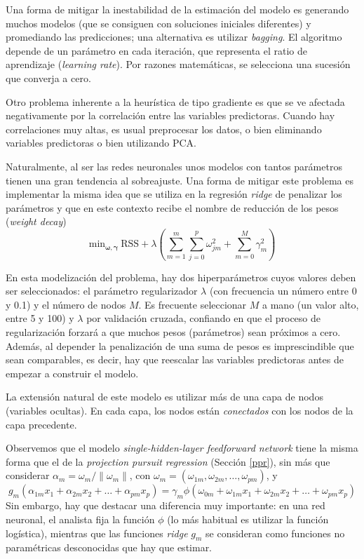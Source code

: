 \documentclass[
  spanish,
]{book}
\theoremstyle{break}
\theoremstyle{definition}
\theoremstyle{definition}
\theoremstyle{definition}
\theoremstyle{remark}
\begin{document}
Una forma de mitigar la inestabilidad de la estimación del modelo es generando muchos modelos (que se consiguen con soluciones iniciales diferentes) y promediando las predicciones; una alternativa es utilizar \emph{bagging}. El algoritmo depende de un parámetro en cada iteración, que representa el ratio de aprendizaje (\emph{learning rate}). Por razones matemáticas, se selecciona una sucesión que converja a cero.

Otro problema inherente a la heurística de tipo gradiente es que se ve afectada negativamente por la correlación entre las variables predictoras. Cuando hay correlaciones muy altas, es usual preprocesar los datos, o bien eliminando variables predictoras o bien utilizando PCA.

Naturalmente, al ser las redes neuronales unos modelos con tantos parámetros tienen una gran tendencia al sobreajuste. Una forma de mitigar este problema es implementar la misma idea que se utiliza en la regresión \emph{ridge} de penalizar los parámetros y que en este contexto recibe el nombre de reducción de los pesos (\emph{weight decay})
\[\mbox{min}_{\boldsymbol{\omega}, \boldsymbol{\gamma}}\ \mbox{RSS} + 
\lambda \left(\sum_{m=1}^m \sum_{j=0}^p \omega_{jm}^2 + \sum_{m=0}^M \gamma_m^2
\right)\]

En esta modelización del problema, hay dos hiperparámetros cuyos valores deben ser seleccionados: el parámetro regularizador \(\lambda\) (con frecuencia un número entre 0 y 0.1) y el número de nodos \(M\). Es frecuente seleccionar \(M\) a mano (un valor alto, entre 5 y 100) y \(\lambda\) por validación cruzada, confiando en que el proceso de regularización forzará a que muchos pesos (parámetros) sean próximos a cero. Además, al depender la penalización de una suma de pesos es imprescindible que sean comparables, es decir, hay que reescalar las variables predictoras antes de empezar a construir el modelo.

La extensión natural de este modelo es utilizar más de una capa de nodos (variables ocultas). En cada capa, los nodos están \emph{conectados} con los nodos de la capa precedente.

Observemos que el modelo \emph{single-hidden-layer feedforward network} tiene la misma forma que el de la \emph{projection pursuit regression} (Sección \ref{ppr}), sin más que considerar \(\alpha_m = \omega_m/\| \omega_m \|\), con \(\omega_m = (\omega_{1m}, \omega_{2m}, \ldots, \omega_{pm})\), y
\[g_m (\alpha_{1m}x_1 + \alpha_{2m}x_2 + \ldots + \alpha_{pm}x_p) = 
\gamma_m \phi(\omega_{0m} + \omega_{1m} x_1 + \omega_{2m} x_2 + \ldots + \omega_{pm} x_p)\]
Sin embargo, hay que destacar una diferencia muy importante: en una red neuronal, el analista fija la función \(\phi\) (lo más habitual es utilizar la función logística), mientras que las funciones \emph{ridge} \(g_m\) se consideran como funciones no paramétricas desconocidas que hay que estimar.
\end{document}

